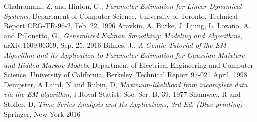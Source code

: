 \documentclass[12pt,leqno]{article}
\begin{document}

\begin{thebibliography}{9}
  Ghahramani, Z. and Hinton, G.,
  \emph{Parameter Estimation for Linear Dynamical Systems},
  Department of Computer Science, University of Toronto,
  Technical Report CRG-TR-96-2,
  Feb. 22, 1996
  Aravkin, A. Burke, J. Ljung, L. Lozano, A. and Pillonetto, G.,
  \emph{Generalized Kalman Smoothing: Modeling and Algorithms},
  arXiv:1609.06369,
  Sep. 25, 2016
  Bilmes, J.,
   \emph{A Gentle Tutorial of the EM Algorithm and its Application to Parameter Estimation
    for Gaussian Maixture and Hidden Markov Models},
  Department of Electrical Engineering and Computer Science, University of California, Berkeley,
  Technical Report 97-021
  April, 1998
  Dempster, A Laird, N and Rubin, D,
   \emph{Maximum-likelihood from incomplete data via the EM algorithm},
  J.Royal Statist. Soc. Ser. B, 39,
   1977
  Shumway, R and Stoffer, D,
  \emph{Time Series Analysis and Its Applications, 3rd Ed. (Blue printing)}
  Springer, New York 2016
    
\end{thebibliography}
 
\end{document}
